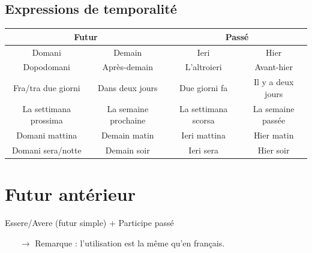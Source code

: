 \documentclass[12pt, openany]{report}
\begin{document}
\subsection{Expressions de temporalité}
\begin{center}
    \begin{tabular}{c|c|c|c}
        \multicolumn{2}{c|}{\textbf{Futur}} & \multicolumn{2}{c}{\textbf{Passé}} \\ \hline
        Domani & Demain & Ieri & Hier \\
        Dopodomani & Après-demain & L'altroieri & Avant-hier \\
        Fra/tra due giorni & Dans deux jours & Due giorni fa & Il y a deux jours \\
        La settimana prossima & La semaine prochaine & La settimana scorsa & La semaine passée \\
        Domani mattina & Demain matin & Ieri mattina & Hier matin \\
        Domani sera/notte & Demain soir & Ieri sera & Hier soir \\
    \end{tabular}
\end{center}
\section{Futur antérieur}
\begin{center}
    Essere/Avere (futur simple) + Participe passé 
\end{center}
\begin{itemize}
    \item [$\to$] Remarque : l'utilisation est la même qu'en français.
\end{itemize}
\end{document}
